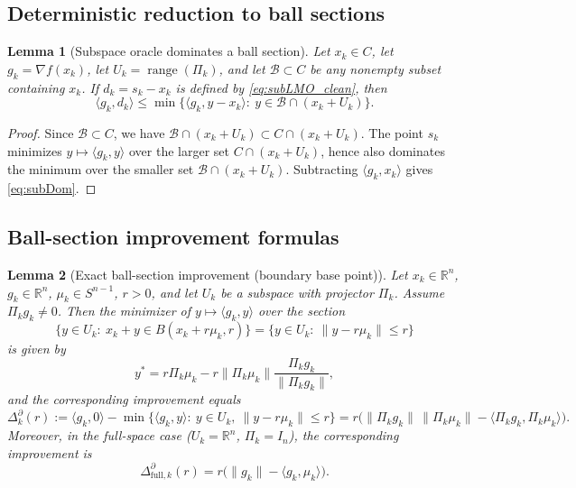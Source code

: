 \documentclass{article}
\DeclareMathOperator{\range}{range}
\newtheorem{lemma}{Lemma}
\begin{document}
\subsection{Deterministic reduction to ball sections}

\begin{lemma}[Subspace oracle dominates a ball section]
\label{lem:subvsball}
Let $x_k\in C$, let $g_k=\nabla f(x_k)$, let $U_k=\range(\Pi_k)$, and let $\mathcal B\subset C$ be any nonempty subset containing $x_k$. If $d_k=s_k-x_k$ is defined by \eqref{eq:subLMO_clean}, then
\begin{equation}
\langle g_k,d_k\rangle
\le \min\{\langle g_k,y-x_k\rangle:\ y\in \mathcal B\cap(x_k+U_k)\}.
\label{eq:subDom}
\end{equation}
\end{lemma}

\begin{proof}
Since $\mathcal B\subset C$, we have $\mathcal B\cap(x_k+U_k)\subset C\cap(x_k+U_k)$. The point $s_k$ minimizes $y\mapsto \langle g_k,y\rangle$ over the larger set $C\cap(x_k+U_k)$, hence also dominates the minimum over the smaller set $\mathcal B\cap(x_k+U_k)$. Subtracting $\langle g_k,x_k\rangle$ gives \eqref{eq:subDom}.
\end{proof}

\subsection{Ball-section improvement formulas}

\begin{lemma}[Exact ball-section improvement (boundary base point)]
\label{lem:ballSectionExact_clean}
Let $x_k\in\mathbb R^n$, $g_k\in\mathbb R^n$, $\mu_k\in S^{n-1}$, $r>0$, and let $U_k$ be a subspace with projector $\Pi_k$. Assume $\Pi_k g_k\neq 0$. Then the minimizer of $y\mapsto \langle g_k,y\rangle$ over the section
\begin{equation}
\{y\in U_k:\ x_k+y\in B(x_k+r\mu_k,r)\}
=\{y\in U_k:\ \|y-r\mu_k\|\le r\}
\label{eq:SectionSet}
\end{equation}
is given by
\begin{equation}
y^* = r\Pi_k \mu_k - r\|\Pi_k \mu_k\|\frac{\Pi_k g_k}{\|\Pi_k g_k\|},
\label{eq:tstar}
\end{equation}
and the corresponding improvement equals
\begin{equation}
\Delta_{k}^{\partial}(r)
:=
\langle g_k,0\rangle-\min\{\langle g_k,y\rangle:\ y\in U_k,\ \|y-r\mu_k\|\le r\}
=
r\Big(\|\Pi_k g_k\|\,\|\Pi_k \mu_k\|-\langle \Pi_k g_k,\Pi_k \mu_k\rangle\Big).
\label{eq:BallImproveExact}
\end{equation}
Moreover, in the full-space case ($U_k=\mathbb R^n$, $\Pi_k=I_n$), the corresponding improvement is
\begin{equation}
\Delta_{\mathrm{full},k}^{\partial}(r)
=
r\Big(\|g_k\|-\langle g_k,\mu_k\rangle\Big).
\label{eq:BallImproveExact_full}
\end{equation}
\end{lemma}
\end{document}
